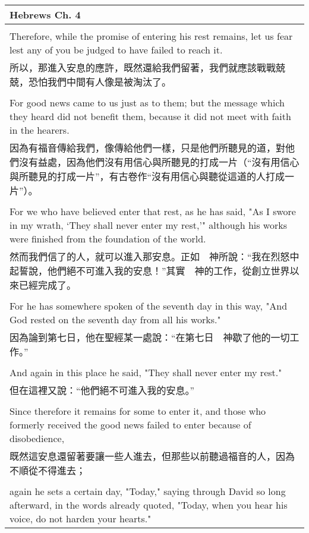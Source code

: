 \documentclass{book}
\begin{document}
\newpage

\begin{tabularx}{\textwidth}{p{}}
\hline
Hebrews Ch. 4 \\
\hline \\
Therefore, while the promise of entering his rest remains, let us fear lest any of you be judged to have failed to reach it. \\
所以，那進入安息的應許，既然還給我們留著，我們就應該戰戰兢兢，恐怕我們中間有人像是被淘汰了。 \\ \\
For good news came to us just as to them; but the message which they heard did not benefit them, because it did not meet with faith in the hearers. \\
因為有福音傳給我們，像傳給他們一樣，只是他們所聽見的道，對他們沒有益處，因為他們沒有用信心與所聽見的打成一片（“沒有用信心與所聽見的打成一片”，有古卷作“沒有用信心與聽從這道的人打成一片”）。 \\ \\
For we who have believed enter that rest, as he has said, "As I swore in my wrath, `They shall never enter my rest,'" although his works were finished from the foundation of the world. \\
然而我們信了的人，就可以進入那安息。正如　神所說：“我在烈怒中起誓說，他們絕不可進入我的安息！”其實　神的工作，從創立世界以來已經完成了。 \\ \\
For he has somewhere spoken of the seventh day in this way, "And God rested on the seventh day from all his works." \\
因為論到第七日，他在聖經某一處說：“在第七日　神歇了他的一切工作。” \\ \\
And again in this place he said, "They shall never enter my rest." \\
但在這裡又說：“他們絕不可進入我的安息。” \\ \\
Since therefore it remains for some to enter it, and those who formerly received the good news failed to enter because of disobedience, \\
既然這安息還留著要讓一些人進去，但那些以前聽過福音的人，因為不順從不得進去； \\ \\
again he sets a certain day, "Today," saying through David so long afterward, in the words already quoted, "Today, when you hear his voice, do not harden your hearts." \\

\end{tabularx}
\end{document}

